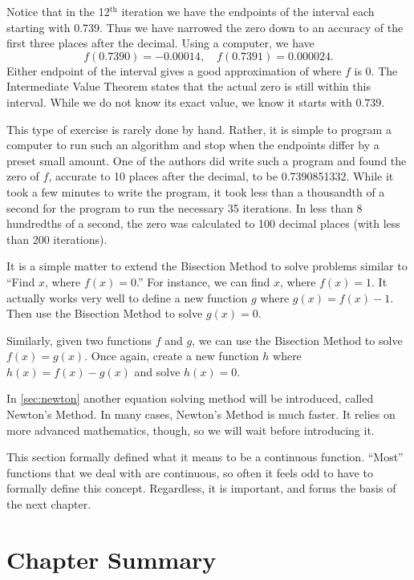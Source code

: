 \begin{example}
Notice that in the 12$^\text{th}$ iteration we have the endpoints of the interval each starting with $0.739$. Thus we have narrowed the zero down to an accuracy of the first three places after the decimal. Using a computer, we have 
\[ f(0.7390) = -0.00014, \quad f(0.7391) = 0.000024.\]
Either endpoint of the interval gives a good approximation of where $f$ is 0. The Intermediate Value Theorem states that the actual zero is still within this interval. While we do not know its exact value, we know it starts with $0.739$. 

This type of exercise is rarely done by hand. Rather, it is simple to program a computer to run such an algorithm and stop when the endpoints differ by a preset small amount. One of the authors did write such a program and found the zero of $f$, accurate to 10 places after the decimal, to be 0.7390851332. While it took a few minutes to write the program, it took less than a thousandth of a second for the program to run the necessary 35 iterations. In less than 8 hundredths of a second, the zero was calculated to 100 decimal places (with less than 200 iterations).
\end{example}

It is a simple matter to extend the Bisection Method to solve problems similar to ``Find $x$, where $f(x) = 0$.'' For instance, we can find $x$, where $f(x) = 1$. %
It actually works very well to define a new function $g$ where $g(x) = f(x) - 1$. Then use the Bisection Method to solve $g(x)=0$.  

Similarly, given two functions $f$ and $g$, we can use the Bisection Method to solve $f(x) = g(x)$. Once again, create a new function $h$ where $h(x) = f(x)-g(x)$ and solve $h(x) = 0$. 

In \autoref{sec:newton} another equation solving method will be introduced, called Newton's Method. In many cases, Newton's Method is much faster. It relies on more advanced mathematics, though, so we will wait before introducing it. 

This section formally defined what it means to be a continuous function. ``Most'' functions that we deal with are continuous, so often it feels odd to have to formally define this concept. Regardless, it is important, and forms the basis of the next chapter.


\section*{Chapter Summary}

